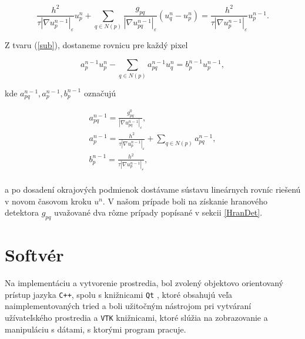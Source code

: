 \documentclass[a4paper,11pt,oneside]{article}%
\def\epsilon{\varepsilon}
\begin{document}
\begin{equation} \label{sub}
\frac{h^2}{\tau|\nabla u_p^{n-1}|_{\epsilon}}u_p^n + \sum_{q \in N(p)}\frac{g_{pq}}{|\nabla u_{pq}^{n-1}|_{\epsilon}}(u_q^n - u_p^n) = \frac{h^2}{\tau|\nabla u_p^{n-1}|_{\epsilon}}u_p^{n - 1}.
\end{equation}

Z tvaru (\ref{sub}), dostaneme rovnicu pre každý pixel

\begin{equation}
a_p^{n - 1}u_p^n - \sum_{q \in N(p)} a_{pq}^{n - 1}u_q^n = b_p^{n-1}u_p^{n-1},
\end{equation}

kde $a_{pq}^{n - 1}, a_p^{n - 1}, b_p^{n - 1}$ označujú

\begin{equation}
\begin{array}{l}
a_{pq}^{n - 1}  = \frac{g_{pq}^{0}}{|\nabla u_{pq}^{n-1}|_{\epsilon}}, \\
a_p^{n - 1} = \frac{h^2}{\tau|\nabla u_p^{n-1}|_{\epsilon}} + \sum_{q \in N(p)} a_{pq}^{n - 1}, \\
b_p^{n - 1} = \frac{h^2}{\tau|\nabla u_p^{n-1}|_{\epsilon}}, \\
\end{array}
\end{equation}

a po dosadení okrajových podmienok dostávame sústavu lineárnych rovníc riešenú v novom časovom kroku $u^n$. V našom prípade boli na získanie hranového detektora $g_{pq}$ uvažované dva rôzne prípady popísané v sekcii \ref{HranDet}.




\newpage
\section{Softvér}

Na implementáciu a vytvorenie prostredia, bol zvolený objektovo orientovaný prístup jazyka \texttt{C++}, spolu s knižnicami \texttt{Qt} \cite{qt}, ktoré obsahujú veľa naimplementovaných tried a boli užitočným nástrojom pri vytváraní užívateľského prostredia a \texttt{VTK} \cite{vtk} knižnicami, ktoré slúžia na zobrazovanie a manipuláciu s dátami, s ktorými program pracuje. 
\end{document}
